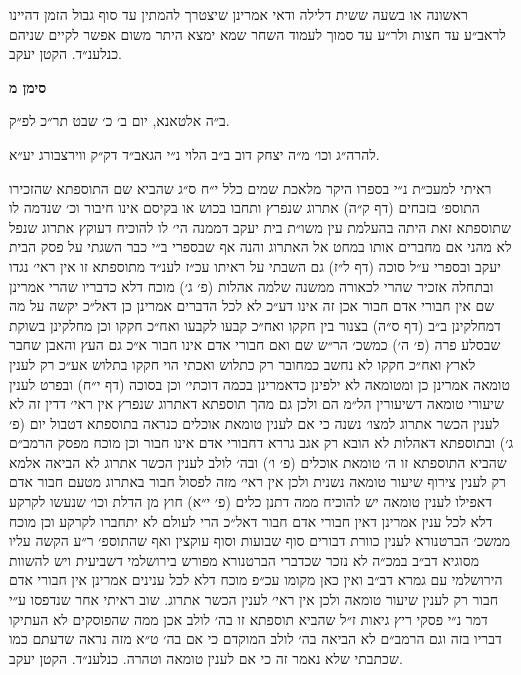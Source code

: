 \documentclass[12pt, openany]{book}
\newcommand{\chapname}{}
\newcommand{\newchap}[1]{
	\addcontentsline{toc}{chapter}{#1}
	\renewcommand{\chapname}{#1}
		\begin{center}
			\textbf{%
\fontsize{16pt}{16pt}\selectfont
				#1}
		\end{center}
}
\begin{document}
\begin{multicols}{2}
ראשונה או בשעה ששית דלילה ודאי אמרינן שיצטרך להמתין עד סוף גבול הזמן דהיינו לראב״ע עד חצות ולר״ע עד סמוך לעמוד השחר שמא ימצא היתר משום אפשר לקיים שניהם כנלענ״ד. הקטן יעקב.\\\vspace{0pt}

\end{multicols}\newpage

\newchap{סימן מ}
\begin{multicols}{2}
ב״ה אלטאנא, יום ב׳ כ׳ שבט תר״כ לפ״ק.\\\vspace{0pt}

להרה״ג וכו׳ מ״ה יצחק דוב ב״ב הלוי נ״י הגאב״ד דק״ק ווירצבורג יע״א.\\\vspace{0pt}

ראיתי למעכ״ת נ״י בספרו היקר מלאכת שמים כלל י״ח ס״ג שהביא שם התוספתא שהזכירו התוספ׳ בזבחים (דף ק״ה) אתרוג שנפרץ ותחבו בכוש או בקיסם אינו חיבור וכ׳ שנדמה לו שתוספתא זאת היתה בהעלמת עין משו״ת בית יעקב דממנה הי׳ לו להוכיח דעוקץ אתרוג שנפל לא מהני אם מחברים אותו במחט אל האתרוג והנה אף שבספרי ב״י כבר השגתי על פסק הבית יעקב ובספרי ע״ל סוכה (דף ל״ז) גם השבתי על ראיתו עכ״ז לענ״ד מתוספתא זו אין ראי׳ נגדו ובתחלה אזכיר שהרי לכאורה ממשנה שלמה אהלות (פ׳ ג׳) מוכח דלא כדבריו שהרי אמרינן שם אין חבורי אדם חבור אכן זה אינו דע״כ לא לכל הדברים אמרינן כן דאל״כ יקשה על מה דמחלקינן ב״ב (דף ס״ה) בצנור בין חקקו ואח״כ קבעו לקבעו ואח״כ חקקו וכן מחלקינן בשוקת שבסלע פרה (פ׳ ה׳) כמשכ׳ הר״ש שם ואם חבורי אדם אינו חבור א״כ גם העץ והאבן שחבר לארץ ואח״כ חקקו לא נחשב כמחובר רק כתלוש ואכתי הוי חקקו בתלוש אע״כ רק לענין טומאה אמרינן כן ומטומאה לא ילפינן כדאמרינן בכמה דוכתי׳ וכן בסוכה (דף י״ח) ובפרט לענין שיעורי טומאה דשיעורין הל״מ הם ולכן גם מהך תוספתא דאתרוג שנפרץ אין ראי׳ דדין זה לא לענין הכשר אתרוג למצו׳ נשנה כי אם לענין טומאת אוכלים כנראה בתוספתא דטבול יום (פ׳ ג׳) ובתוספתא דאהלות לא הובא רק אגב גררא דחבורי אדם אינו חבור וכן מוכח מפסק הרמב״ם שהביא התוספתא זו ה׳ טומאת אוכלים (פ׳ ו׳) ובה׳ לולב לענין הכשר אתרוג לא הביאה אלמא רק לענין צירוף שיעור טומאה נשנית ולכן אין ראי׳ מזה לפסול חבור באתרוג מטעם חבור אדם דאפילו לענין טומאה יש להוכיח ממה דתנן כלים (פ׳ י״א) חוץ מן הדלת וכו׳ שנעשו לקרקע דלא לכל ענין אמרינן דאין חבורי אדם חבור דאל״כ הרי לעולם לא יתחברו לקרקע וכן מוכח ממשכ׳ הברטנורא לענין כוורת דבורים סוף שבועות וסוף עוקצין ואף שהתוספ׳ ר״ע הקשה עליו מסוגיא דב״ב במכ״ה לא נזכר שכדברי הברטנורא מפורש בירושלמי דשביעית ויש להשוות הירושלמי עם גמרא דב״ב ואין כאן מקומו עכ״פ מוכח דלא לכל ענינים אמרינן אין חבורי אדם חבור רק לענין שיעור טומאה ולכן אין ראי׳ לענין הכשר אתרוג. שוב ראיתי אחר שנדפסו ע״י דמר נ״י פסקי ריץ גיאות ז״ל שהביא תוספתא זו בה׳ לולב אכן ממה שהפוסקים לא העתיקו דבריו בזה וגם הרמב״ם לא הביאה בה׳ לולב המוקדם כי אם בה׳ ט״א מזה נראה שדעתם כמו שכתבתי שלא נאמר זה כי אם לענין טומאה וטהרה. כנלענ״ד. הקטן יעקב.\\\vspace{0pt}

\end{multicols}\newpage
\end{document}
